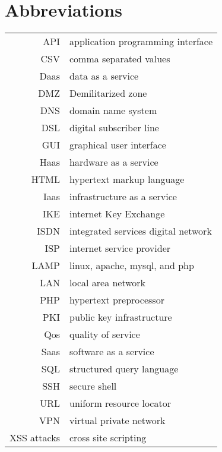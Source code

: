 \chapter*{Abbreviations} 

\begin{longtable}{rl}
API & application programming interface\\
CSV & comma separated values\\
Daas & data as a service\\
DMZ & Demilitarized zone\\
DNS & domain name system\\
DSL & digital subscriber line\\
GUI & graphical user interface\\
Haas & hardware as a service\\
HTML & hypertext markup language\\
Iaas & infrastructure as a service\\
IKE & internet Key Exchange\\
ISDN & integrated services digital network\\
ISP & internet service provider\\
LAMP & linux, apache, mysql, and php\\
LAN & local area network\\
PHP & hypertext preprocessor\\
PKI & public key infrastructure\\
Qos & quality of service\\
Saas & software as a service\\
SQL & structured query language\\
SSH & secure shell\\
URL & uniform resource locator\\
VPN & virtual private network\\
XSS attacks & cross site scripting\\
\end{longtable}